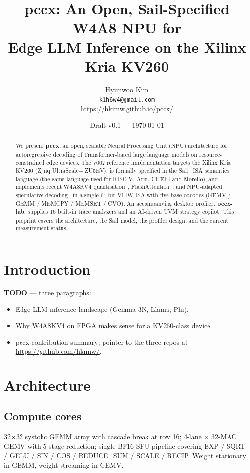 \documentclass[11pt,a4paper]{article}
\title{%
  pccx: An Open, Sail-Specified W4A8 NPU for\\
  Edge LLM Inference on the Xilinx Kria KV260
}
\author{%
  Hyunwoo Kim\\
  \texttt{k1h6w4@gmail.com}\\
  \small \url{https://hkimw.github.io/pccx/}
}
\date{Draft v0.1 --- \today}
\begin{document}
\maketitle

\begin{abstract}
We present \textbf{pccx}, an open, scalable Neural Processing Unit
(NPU) architecture for autoregressive decoding of Transformer-based
large language models on resource-constrained edge devices.  The v002
reference implementation targets the Xilinx Kria KV260 (Zynq
UltraScale+ ZU5EV), is formally specified in the
Sail~\cite{armstrong2019isa} ISA semantics language (the same language
used for RISC-V, Arm, CHERI and Morello), and implements recent W4A8KV4
quantisation~\cite{qserve2024}, FlashAttention~\cite{dao2023flash2},
and NPU-adapted speculative decoding~\cite{openpangu2026} in a single
64-bit VLIW ISA with five base opcodes (GEMV / GEMM / MEMCPY /
MEMSET / CVO).  An accompanying desktop profiler, \textbf{pccx-lab},
supplies 16 built-in trace analyzers and an AI-driven UVM strategy
copilot.  This preprint covers the architecture, the Sail model, the
profiler design, and the current measurement status.
\end{abstract}

\section{Introduction}
\label{sec:introduction}

\textbf{TODO} — three paragraphs:
\begin{itemize}
  \item Edge LLM inference landscape (Gemma 3N, Llama, Phi).
  \item Why W4A8KV4 on FPGA makes sense for a KV260-class device.
  \item pccx contribution summary; pointer to the three repos at
        \url{https://github.com/hkimw/}.
\end{itemize}

\section{Architecture}
\label{sec:architecture}

\subsection{Compute cores}

32$\times$32 systolic GEMM array with cascade break at row 16;
4-lane $\times$ 32-MAC GEMV with 5-stage reduction; single BF16 SFU
pipeline covering EXP / SQRT / GELU / SIN / COS / REDUCE\_SUM /
SCALE / RECIP.  Weight stationary in GEMM, weight streaming in GEMV.
\end{document}
